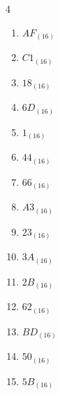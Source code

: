 \begin{multicols}{4}
\begin{enumerate}
\columnbreak %

  \item $AF_{(16)}$

        \phantom{$=175$}

  \item $C1_{(16)}$

        \phantom{$=193$}

  \item $18_{(16)}$

        \phantom{$=24$}

  \item $6D_{(16)}$

        \phantom{$=109$}

  \item $1_{(16)}$

        \phantom{$=1$}

  \item $44_{(16)}$

        \phantom{$=68$}

  \item $66_{(16)}$

        \phantom{$=102$}

  \item $A3_{(16)}$

        \phantom{$=163$}

  \item $23_{(16)}$

        \phantom{$=35$}

  \item $3A_{(16)}$

        \phantom{$=58$}

  \item $2B_{(16)}$

        \phantom{$=43$}

  \item $62_{(16)}$

        \phantom{$=98$}

  \item $BD_{(16)}$

        \phantom{$=189$}

  \item $50_{(16)}$

        \phantom{$=80$}

  \item $5B_{(16)}$

        \phantom{$=91$}

\columnbreak %


\end{enumerate}
\end{multicols}
